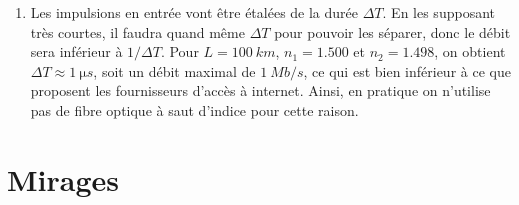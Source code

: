 \documentclass[../../main/main.tex]{subfiles}
\begin{document}
{\begin{enumerate}
		\item Les impulsions en entrée vont être étalées de la durée $\Delta{T}$. En
		      les supposant très courtes, il faudra quand même $\Delta{T}$ pour pouvoir
		      les séparer, donc le débit sera inférieur à $1/\Delta{T}$. Pour $L =
			      \SI{100}{km}$, $n_1 = \num{1.500}$ et $n_2 = \num{1.498}$, on obtient
		      $\Delta{T} \approx \SI{1}{\micro s}$, soit un débit maximal de
		      $\SI{1}{Mb/s}$, ce qui est bien inférieur à ce que proposent les
		      fournisseurs d'accès à internet. Ainsi, en pratique on n'utilise pas de
		      fibre optique à saut d'indice pour cette raison.
	\end{enumerate}
}

\section{Mirages}
\end{document}
